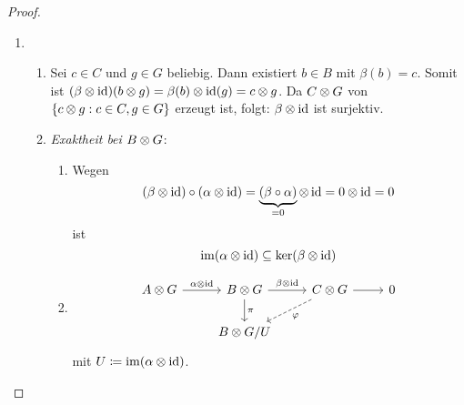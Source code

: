 \begin{proof}
  \begin{enumerate}
    \item
      \begin{enumerate}
        \item
          Sei $c \in C$ und $g \in G$ beliebig.
          Dann existiert $b \in B$ mit $\beta(b) = c$.
          Somit ist $(\beta \otimes \operatorname{id}) (b \otimes g) = \beta(b) \otimes \operatorname{id}(g) = c \otimes g$.
          Da $C \otimes G$ von $\left\{ c \otimes g : c \in C, g \in G \right\}$ erzeugt ist, folgt: $\beta \otimes \operatorname{id}$ ist surjektiv.
        \item
          \emph{Exaktheit bei $B \otimes G$}:
          \begin{enumerate}[($\alpha$)]
            \item
              Wegen
              \begin{equation*}
                (\beta \otimes \operatorname{id}) \circ (\alpha \otimes \operatorname{id}) = \underbrace{(\beta \circ \alpha)}_{= 0} \otimes \operatorname{id} = 0 \otimes \operatorname{id} = 0
              \end{equation*}
              ist
              \begin{equation*}
                \operatorname{im} (\alpha \otimes \operatorname{id}) \subseteq \ker (\beta \otimes \operatorname{id})
              \end{equation*}
            \item
              \begin{equation*}
                \begin{tikzcd}
                  A \tensor G
                    \arrow{r}{\alpha \tensor \id}
                  & B \tensor G
                    \arrow{r}{\beta \tensor \id}
                    \arrow{d}{\pi}
                  & C \tensor G
                    \arrow{r}{}
                    \arrow[dashed]{dl}{\varphi}
                  & 0\\
                  & B \tensor G / U
                \end{tikzcd}
              \end{equation*}
              mit $U \coloneqq \operatorname{im}(\alpha \otimes \operatorname{id})$.


\end{enumerate}
\end{enumerate}
\end{enumerate}
\end{proof}
